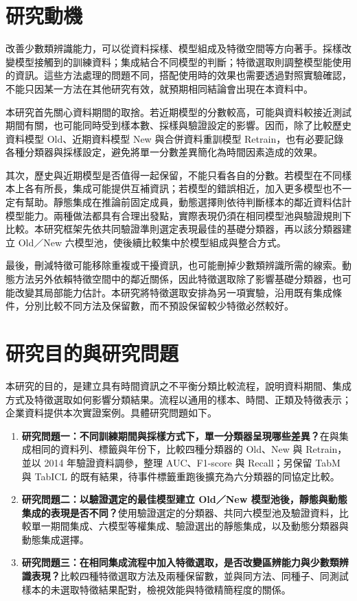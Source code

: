 \section{研究動機}

改善少數類辨識能力，可以從資料採樣、模型組成及特徵空間等方向著手。採樣改變模型接觸到的訓練資料；集成結合不同模型的判斷；特徵選取則調整模型能使用的資訊。這些方法處理的問題不同，搭配使用時的效果也需要透過對照實驗確認，不能只因某一方法在其他研究有效，就預期相同結論會出現在本資料中。

本研究首先關心資料期間的取捨。若近期模型的分數較高，可能與資料較接近測試期間有關，也可能同時受到樣本數、採樣與驗證設定的影響。因而，除了比較歷史資料模型 Old、近期資料模型 New 與合併資料重訓模型 Retrain，也有必要記錄各種分類器與採樣設定，避免將單一分數差異簡化為時間因素造成的效果。

其次，歷史與近期模型是否值得一起保留，不能只看各自的分數。若模型在不同樣本上各有所長，集成可能提供互補資訊；若模型的錯誤相近，加入更多模型也不一定有幫助。靜態集成在推論前固定成員，動態選擇則依待判斷樣本的鄰近資料估計模型能力。兩種做法都具有合理出發點，實際表現仍須在相同模型池與驗證規則下比較。本研究框架先依共同驗證準則選定表現最佳的基礎分類器，再以該分類器建立 Old／New 六模型池，使後續比較集中於模型組成與整合方式。

最後，刪減特徵可能移除重複或干擾資訊，也可能刪掉少數類辨識所需的線索。動態方法另外依賴特徵空間中的鄰近關係，因此特徵選取除了影響基礎分類器，也可能改變其局部能力估計。本研究將特徵選取安排為另一項實驗，沿用既有集成條件，分別比較不同方法及保留數，而不預設保留較少特徵必然較好。

\section{研究目的與研究問題}

本研究的目的，是建立具有時間資訊之不平衡分類比較流程，說明資料期間、集成方式及特徵選取如何影響分類結果。流程以通用的樣本、時間、正類及特徵表示；企業資料提供本次實證案例。具體研究問題如下。

\begin{enumerate}
\item \textbf{研究問題一：不同訓練期間與採樣方式下，單一分類器呈現哪些差異？}在與集成相同的資料列、標籤與年份下，比較四種分類器的 Old、New 與 Retrain，並以 2014 年驗證資料調參，整理 AUC、F1-score 與 Recall；另保留 TabM 與 TabICL 的既有結果，待事件標籤重跑後擴充為六分類器的同協定比較。
\item \textbf{研究問題二：以驗證選定的最佳模型建立 Old／New 模型池後，靜態與動態集成的表現是否不同？}使用驗證選定的分類器、共同六模型池及驗證資料，比較單一期間集成、六模型等權集成、驗證選出的靜態集成，以及動態分類器與動態集成選擇。
\item \textbf{研究問題三：在相同集成流程中加入特徵選取，是否改變區辨能力與少數類辨識表現？}比較四種特徵選取方法及兩種保留數，並與同方法、同種子、同測試樣本的未選取特徵結果配對，檢視效能與特徵精簡程度的關係。
\end{enumerate}

